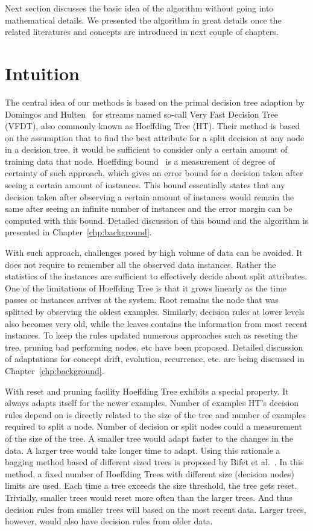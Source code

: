 \documentclass[a4paper, 11pt, oneside]{book}
\begin{document}
Next section discusses the basic idea of the algorithm without going into mathematical details. We presented the algorithm in great details once the related literatures and concepts are introduced in next couple of chapters.

\section{Intuition}
The central idea of our methods is based on the primal decision tree adaption by Domingos and Hulten~\cite{domingos00:vfdt} for streams named so-call Very Fast Decision Tree (VFDT), also commonly known as Hoeffding Tree (HT). Their method is based on the assumption that to find the best attribute for a split decision at any node in a decision tree, it would be sufficient to consider only a certain amount of training data that node. Hoeffding bound~\cite{hoeffding63:bound} is a measurement of degree of certainty of such approach, which gives an error bound for a decision taken after seeing a certain amount of instances. This bound essentially states that any decision taken after observing a certain amount of instances would remain the same after seeing an infinite number of instances and the error margin can be computed with this bound. Detailed discussion of this bound and the algorithm is presented in Chapter~\ref{chp:background}.

With such approach, challenges posed by high volume of data can be avoided. It does not require to remember all the observed data instances. Rather the statistics of the instances are sufficient to effectively decide about split attributes. One of the limitations of Hoeffding Tree is that it grows linearly as the time passes or instances arrives at the system. Root remains the node that was splitted by observing the oldest examples. Similarly, decision rules at lower levels also becomes very old, while the leaves contains the information from most recent instances. To keep the rules updated numerous approaches such as reseting the tree, pruning bad performing nodes, etc have been proposed. Detailed discussion of adaptations for concept drift, evolution, recurrence, etc. are being discussed in Chapter~\ref{chp:background}.

With reset and pruning facility Hoeffding Tree exhibits a special property. It always adapts itself for the newer examples. Number of examples HT's decision rules depend on is directly related to the size of the tree and number of examples required to split a node. Number of decision or split nodes could a measurement of the size of the tree. A smaller tree would adapt faster to the changes in the data. A larger tree would take longer time to adapt. Using this rationale a bagging method based of different sized trees is proposed by Bifet et al.~\cite{bifet09:asht}. In this method, a fixed number of Hoeffding Trees with different size (decision nodes) limits are used. Each time a tree exceeds the size threshold, the tree gets reset. Trivially, smaller trees would reset more often than the larger trees. And thus decision rules from smaller trees will based on the most recent data. Larger trees, however, would also have decision rules from older data.
\end{document}
